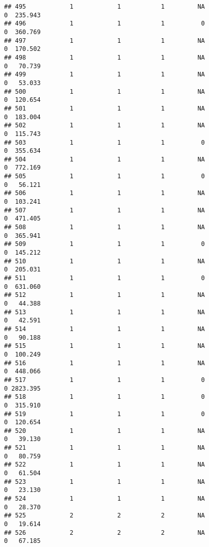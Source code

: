 \documentclass[
]{article}
\begin{document}
\begin{verbatim}
## 495            1            1           1         NA                0  235.943
## 496            1            1           1          0                0  360.769
## 497            1            1           1         NA                0  170.502
## 498            1            1           1         NA                0   70.739
## 499            1            1           1         NA                0   53.033
## 500            1            1           1         NA                0  120.654
## 501            1            1           1         NA                0  183.004
## 502            1            1           1         NA                0  115.743
## 503            1            1           1          0                0  355.634
## 504            1            1           1         NA                0  772.169
## 505            1            1           1          0                0   56.121
## 506            1            1           1         NA                0  103.241
## 507            1            1           1         NA                0  471.405
## 508            1            1           1         NA                0  365.941
## 509            1            1           1          0                0  145.212
## 510            1            1           1         NA                0  205.031
## 511            1            1           1          0                0  631.060
## 512            1            1           1         NA                0   44.388
## 513            1            1           1         NA                0   42.591
## 514            1            1           1         NA                0   90.188
## 515            1            1           1         NA                0  100.249
## 516            1            1           1         NA                0  448.066
## 517            1            1           1          0                0 2823.395
## 518            1            1           1          0                0  315.910
## 519            1            1           1          0                0  120.654
## 520            1            1           1         NA                0   39.130
## 521            1            1           1         NA                0   80.759
## 522            1            1           1         NA                0   61.504
## 523            1            1           1         NA                0   23.130
## 524            1            1           1         NA                0   28.370
## 525            2            2           2         NA                0   19.614
## 526            2            2           2         NA                0   67.185

\end{verbatim}
\end{document}
